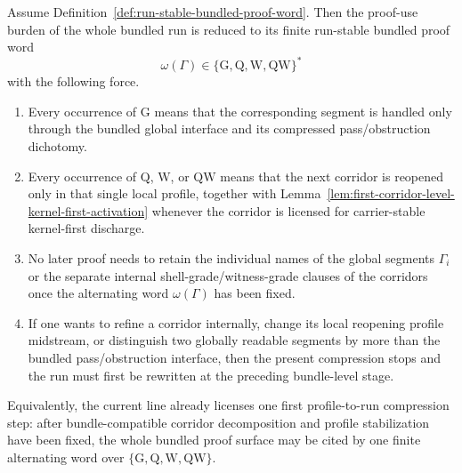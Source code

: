 \begin{proposition}
\label{prop:first-profile-to-run-compression-principle}
Assume Definition~\ref{def:run-stable-bundled-proof-word}. Then the proof-use burden of the whole bundled run is reduced to its finite run-stable bundled proof word
\[
\omega(\Gamma)\in\{\mathrm{G},\mathrm{Q},\mathrm{W},\mathrm{QW}\}^{*}
\]
with the following force.
\begin{enumerate}[leftmargin=2em,label=(\roman*)]
\item Every occurrence of $\mathrm{G}$ means that the corresponding segment is handled only through the bundled global interface and its compressed pass/obstruction dichotomy.
\item Every occurrence of $\mathrm{Q}$, $\mathrm{W}$, or $\mathrm{QW}$ means that the next corridor is reopened only in that single local profile, together with Lemma~\ref{lem:first-corridor-level-kernel-first-activation} whenever the corridor is licensed for carrier-stable kernel-first discharge.
\item No later proof needs to retain the individual names of the global segments $\Gamma_i$ or the separate internal shell-grade/witness-grade clauses of the corridors once the alternating word $\omega(\Gamma)$ has been fixed.
\item If one wants to refine a corridor internally, change its local reopening profile midstream, or distinguish two globally readable segments by more than the bundled pass/obstruction interface, then the present compression stops and the run must first be rewritten at the preceding bundle-level stage.
\end{enumerate}
Equivalently, the current line already licenses one first profile-to-run compression step: after bundle-compatible corridor decomposition and profile stabilization have been fixed, the whole bundled proof surface may be cited by one finite alternating word over $\{\mathrm{G},\mathrm{Q},\mathrm{W},\mathrm{QW}\}$.
\end{proposition}


